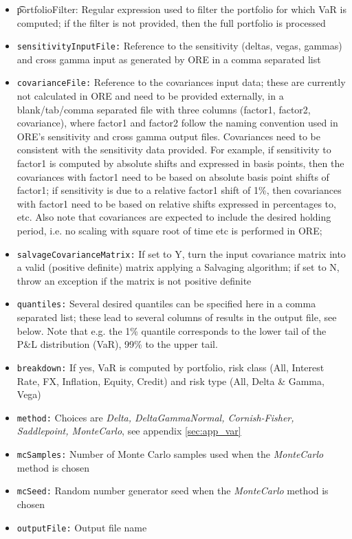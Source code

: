 \documentclass[12pt, a4paper]{article}
\begin{document}
\begin{itemize}
\item {\t portfolioFilter:} Regular expression used to filter the portfolio for which VaR is computed; if the filter is not provided, then the full portfolio is processed
\item {\tt sensitivityInputFile:} Reference to the sensitivity (deltas, vegas, gammas) and cross gamma input as generated by ORE in a comma separated list
\item {\tt covarianceFile:} Reference to the covariances input data; these are currently not calculated in ORE and need to be provided externally, in a blank/tab/comma separated file with three columns (factor1, factor2, covariance), where factor1 and factor2 follow the naming convention used in ORE's sensitivity and cross gamma output files. Covariances need to be consistent with the sensitivity data provided. For example, if sensitivity to factor1 is computed by absolute shifts and expressed in basis points, then the covariances with factor1 need to be based on absolute basis point shifts of factor1; if sensitivity is due to a relative factor1 shift of 1\%, then covariances with factor1 need to be based on relative shifts expressed in percentages to, etc. Also note that covariances are expected to include the desired holding period, i.e. no scaling with square root of time etc is performed in ORE; 
\item {\tt salvageCovarianceMatrix:} If set to Y, turn the input covariance matrix into a valid (positive definite) matrix applying a Salvaging algorithm; if set to N, throw an exception if the matrix is not positive definite
\item {\tt quantiles:} Several desired quantiles can be specified here in a comma separated list; these lead to several columns of results in the output file, see below. Note that e.g. the 1\% quantile corresponds to the lower tail of the P\&L distribution (VaR), 99\% to the upper tail.
\item {\tt breakdown:} If yes, VaR is computed by portfolio, risk class (All, Interest Rate, FX, Inflation, Equity, Credit) and risk type (All, Delta \& Gamma, Vega)
\item {\tt method:} Choices are {\em Delta, DeltaGammaNormal, Cornish-Fisher, Saddlepoint, MonteCarlo}, see appendix \ref{sec:app_var}
\item {\tt mcSamples:} Number of Monte Carlo samples used when the {\em MonteCarlo} method is chosen 
\item {\tt mcSeed:} Random number generator seed when the {\em MonteCarlo} method is chosen
\item {\tt outputFile:} Output file name
\end{itemize}
\end{document}
